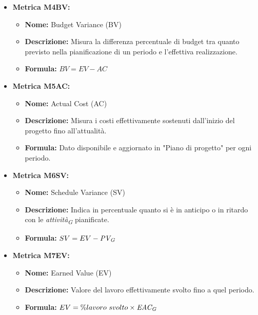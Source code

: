 \begin{itemize}
    \item \hypertarget{item:M4BV}{\textbf{Metrica M4BV:}}
     \begin{minipage}[t]{0.9\textwidth}
          \begin{itemize}
              \item \textbf{Nome:} Budget Variance (BV)
              \item \textbf{Descrizione:} Misura la differenza percentuale di budget tra quanto previsto nella pianificazione di un periodo e l’effettiva realizzazione.
              \item \textbf{Formula:} $BV = EV - AC $
          \end{itemize}
        \end{minipage}

    \item \hypertarget{item:M5AC}{\textbf{Metrica M5AC:}}
    \begin{minipage}[t]{0.9\textwidth}
          \begin{itemize}
              \item \textbf{Nome:} Actual Cost (AC)
              \item \textbf{Descrizione:} Misura i costi effettivamente sostenuti dall’inizio del progetto fino all’attualità.
              \item \textbf{Formula:} Dato disponibile e aggiornato in "Piano di progetto" per ogni periodo.
          \end{itemize}
        \end{minipage}

    \item \hypertarget{item:M6SV}{\textbf{Metrica M6SV:}}
    \begin{minipage}[t]{0.9\textwidth}
          \begin{itemize}
              \item \textbf{Nome:} Schedule Variance (SV)
              \item \textbf{Descrizione:} Indica in percentuale quanto si è in anticipo o in ritardo con le \textit{attività}\textsubscript{\textit{G}} pianificate.
              \item \textbf{Formula:} $SV = EV - \textit{PV}\textsubscript{\textit{G}}$
          \end{itemize}
        \end{minipage}

    \item \hypertarget{item:M7EV}{\textbf{Metrica M7EV:}}
    \begin{minipage}[t]{0.9\textwidth}
          \begin{itemize}
              \item \textbf{Nome:} Earned Value (EV)
              \item \textbf{Descrizione:} Valore del lavoro effettivamente svolto fino a quel periodo.
              \item \textbf{Formula:} $EV = \% lavoro \ svolto \times \textit{EAC}\textsubscript{\textit{G}}$
          \end{itemize}
        \end{minipage}


\end{itemize}
